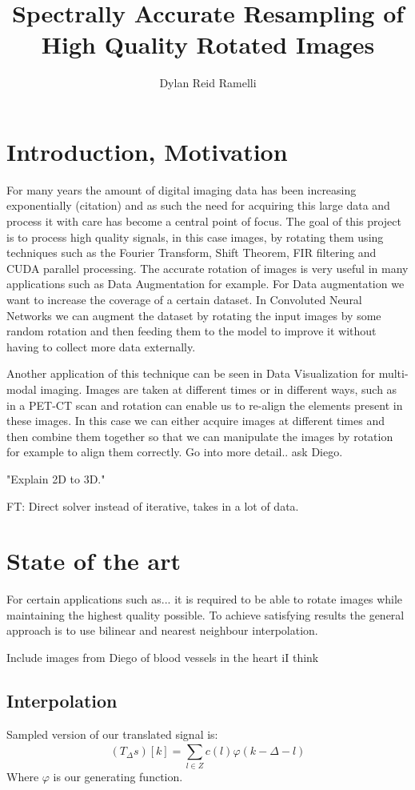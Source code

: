 \documentclass[]{usiinfbachelorproject}
\title{Spectrally Accurate Resampling of High Quality Rotated Images}
\author{Dylan Reid Ramelli}
\begin{document}
	
	\maketitle	
	\section{Introduction, Motivation}\label{introduction}
	For many years the amount of digital imaging data has been increasing exponentially (citation) and as such the need for acquiring this large data and process it with care has become a central point of focus. The goal of this project is to process high quality signals, in this case images, by rotating them using techniques such as the Fourier Transform, Shift Theorem, FIR filtering and CUDA parallel processing.
	The accurate rotation of images is very useful in many applications such as Data Augmentation for example. For Data augmentation we want to increase the coverage of a certain dataset. In Convoluted Neural Networks we can augment the dataset by rotating the input images by some random rotation and then feeding them to the model to improve it without having to collect more data externally. 
	
	Another application of this technique can be seen in Data Visualization for multi-modal imaging. Images are taken at different times or in different ways, such as in a PET-CT scan and rotation can enable us to re-align the elements present in these images. In this case we can either acquire images at different times and then combine them together so that we can manipulate the images by rotation for example to align them correctly. Go into more detail.. ask Diego.


	"Explain 2D to 3D."
	
	FT: Direct solver instead of iterative, takes in a lot of data.
	
	
	\section{State of the art}
	For certain applications such as... it is required to be able to rotate images while maintaining the highest quality possible. To achieve satisfying results the general approach is to use bilinear and nearest neighbour interpolation.
	
	
	Include images from Diego of blood vessels in the heart iI think
	
	
	\iffalse
	
	\subsection{Interpolation}
	Sampled version of our translated signal is:
	\begin{equation}
		(T_\Delta s)[k] = \sum_{l \in Z}^{} c(l)\varphi(k - \Delta - l)
	\end{equation}
	Where $\varphi$ is our generating function.
\end{document}
